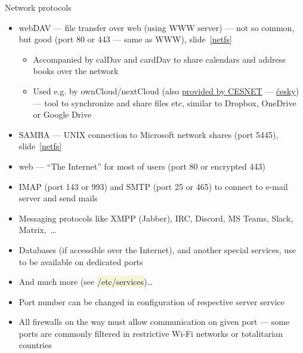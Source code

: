 \documentclass[compress, xelatex, 11pt, xcolor=svgnames, aspectratio=169, url={hyphens, lowtilde}]{beamer}
\renewcommand{\texttt}[1]{\colorbox{Beige}{{\ttfamily #1}}}
\begin{document}
\begin{frame}[allowframebreaks]{Network protocols}
\begin{itemize}
		\begin{itemize}
			\item NFS connection must be set up by administrator
		\end{itemize}
		\item webDAV --- file transfer over web (using WWW server) --- not so common, but good (port 80 or 443 --- same as WWW), slide~\ref{netfs}
		\begin{itemize}
			\item Accompanied by calDav and cardDav to share calendars and address books over the network
			\item Used e.g. by ownCloud/nextCloud (also \href{https://du.cesnet.cz/en/navody/owncloud/start}{provided by CESNET} --- \href{https://du.cesnet.cz/cs/navody/owncloud/start}{česky}) --- tool to synchronize and share files etc, similar to Dropbox, OneDrive or Google Drive
		\end{itemize}
		\item SAMBA --- UNIX connection to Microsoft network shares (port 5445), slide~\ref{netfs}
		\item web --- \enquote{The Internet} for most of users (port 80 or encrypted 443)
		\item IMAP (port 143 or 993) and SMTP (port 25 or 465) to connect to e-mail server and send mails
		\item Messaging protocols like XMPP (Jabber), IRC, Discord, MS Teams, Slack, Matrix,~\ldots
		\item Databases (if accessible over the Internet), and another special services, use to be available on dedicated ports
		\item And much more (see \texttt{/etc/services})\ldots
		\item Port number can be changed in configuration of respective server service
		\item All firewalls on the way must allow communication on given port --- some ports are commonly filtered in restrictive Wi-Fi networks or totalitarian countries
	\end{itemize}
\end{frame}
\end{document}
